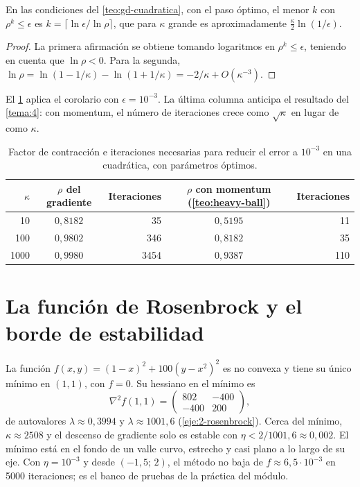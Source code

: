 \begin{corolario}\label{cor:iter-cuadratica}
En las condiciones del \cref{teo:gd-cuadratica}, con el paso óptimo, el menor $k$ con $\rho^{k}\le\epsilon$ es $k=\lceil\ln\epsilon/\ln\rho\rceil$, que para $\kappa$ grande es aproximadamente $\frac{\kappa}{2}\ln(1/\epsilon)$.
\end{corolario}

\begin{proof}
La primera afirmación se obtiene tomando logaritmos en $\rho^{k}\le\epsilon$, teniendo en cuenta que $\ln\rho<0$. Para la segunda, $\ln\rho=\ln(1-1/\kappa)-\ln(1+1/\kappa)=-2/\kappa+O(\kappa^{-3})$.
\end{proof}

El \cref{tab:kappa} aplica el corolario con $\epsilon=10^{-3}$. La última columna anticipa el resultado del \cref{tema:4}: con momentum, el número de iteraciones crece como $\sqrt\kappa$ en lugar de como $\kappa$.

\begin{table}[h]
\centering\small
\caption{Factor de contracción e iteraciones necesarias para reducir el error a $10^{-3}$ en una cuadrática, con parámetros óptimos.}\label{tab:kappa}
\begin{tabular}{@{}rcrcr@{}}
\toprule
$\kappa$ & $\rho$ del gradiente & Iteraciones & $\rho$ con momentum (\cref{teo:heavy-ball}) & Iteraciones \\
\midrule
10 & $0{,}8182$ & 35 & $0{,}5195$ & 11 \\
100 & $0{,}9802$ & 346 & $0{,}8182$ & 35 \\
1000 & $0{,}9980$ & 3454 & $0{,}9387$ & 110 \\
\bottomrule
\end{tabular}
\end{table}

\section{La función de Rosenbrock y el borde de estabilidad}

\begin{ejemplo}\label{ej:rosenbrock}
La función $f(x,y)=(1-x)^{2}+100(y-x^{2})^{2}$ es no convexa y tiene su único mínimo en $(1,1)$, con $f=0$. Su hessiano en el mínimo es
\[
\nabla^{2}f(1,1)=\begin{pmatrix}802&-400\\-400&200\end{pmatrix},
\]
de autovalores $\lambda\approx 0{,}3994$ y $\lambda\approx 1001{,}6$ (\cref{eje:2-rosenbrock}). Cerca del mínimo, $\kappa\approx 2508$ y el descenso de gradiente solo es estable con $\eta<2/1001{,}6\approx 0{,}002$. El mínimo está en el fondo de un valle curvo, estrecho y casi plano a lo largo de su eje. Con $\eta=10^{-3}$ y desde $(-1{,}5;\,2)$, el método no baja de $f\approx 6{,}5\cdot 10^{-3}$ en 5000 iteraciones; es el banco de pruebas de la práctica del módulo.
\end{ejemplo}

